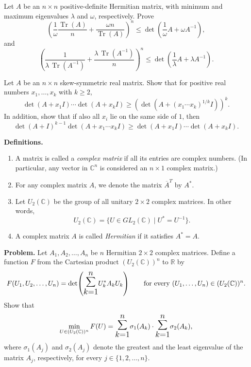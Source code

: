 \documentclass[12pt]{article}
\let\oldsum\sum
\renewcommand{\sum}{\mathlarger{\mathlarger{\oldsum}}}
\begin{document}
\begin{problem}
Let $A$ be an $n\times n$ positive-definite Hermitian matrix, with minimum and maximum
eigenvalues $\lambda$ and $\omega$, respectively. Prove
\[
\left(
\frac{1}{\omega}\frac{\operatorname{Tr}(A)}{n}
+\frac{\omega n}{\operatorname{Tr}(A)}
\right)^n
\le
\det\left(\frac{1}{\omega}A+\omega A^{-1}\right),
\]
and
\[
\left(
\frac{1}{\lambda\,\operatorname{Tr}(A^{-1})}
+\frac{\lambda\,\operatorname{Tr}(A^{-1})}{n}
\right)^n
\le
\det\left(\frac{1}{\lambda}A+\lambda A^{-1}\right).
\]
\end{problem}

\begin{problem}
Let $A$ be an $n\times n$ skew-symmetric real matrix. Show that for positive real numbers
$x_1,\ldots,x_k$ with $k\ge2$,
\[
\det(A+x_1I)\cdots\det(A+x_kI)
\ge
\left(
\det\left(A+(x_1\cdots x_k)^{1/k}I\right)
\right)^k.
\]
In addition, show that if also all $x_i$ lie on the same side of $1$, then
\[
\det(A+I)^{k-1}
\det\left(A+x_1\cdots x_k I\right)
\ge
\det(A+x_1I)\cdots\det(A+x_kI).
\]
\end{problem}

\begin{problem}
\textbf{Definitions.}
\begin{enumerate}[label=\alph*)]
\item A matrix is called a \emph{complex matrix} if all its entries are complex numbers. (In particular, any vector in $\mathbb{C}^n$ is considered an $n\times 1$ complex matrix.)
\item For any complex matrix $A$, we denote the matrix $\overline{A}^T$ by $A^*$.
\item Let $U_2(\mathbb{C})$ be the group of all unitary $2\times 2$ complex matrices. In other words,
\[
U_2(\mathbb{C}) = \{U \in GL_2(\mathbb{C}) \mid U^* = U^{-1}\}.
\]
\item A complex matrix $A$ is called \emph{Hermitian} if it satisfies $A^*=A$.
\end{enumerate}
\textbf{Problem.} Let $A_1, A_2, \dots, A_n$ be $n$ Hermitian $2\times 2$ complex matrices. Define a function $F$ from the Cartesian product $(U_2(\mathbb{C}))^n$ to $\mathbb{R}$ by
\[
F(U_1,U_2,\dots,U_n) = \det\!\left(\sum_{k=1}^n U_k^* A_k U_k\right) \qquad \text{for every } (U_1,\dots,U_n)\in (U_2(\mathbb{C}))^n.
\]
Show that
\[
\min_{U\in (U_2(\mathbb{C}))^n} F(U) = \sum_{k=1}^n \sigma_1(A_k)\cdot \sum_{k=1}^n \sigma_2(A_k),
\]
where $\sigma_1(A_j)$ and $\sigma_2(A_j)$ denote the greatest and the least eigenvalue of the matrix $A_j$, respectively, for every $j\in\{1,2,\dots,n\}$.
\end{problem}
\end{document}

